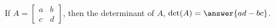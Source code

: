 \documentclass{ximera}
\begin{document}
\begin{question}
If $A = \begin{bmatrix} a & b \\ c & d\end{bmatrix}$, then the determinant of $A$, ${\rm det}(A) = \answer{ad - bc}$. 
\end{question} 

%
%
%
%
%
\end{document}
